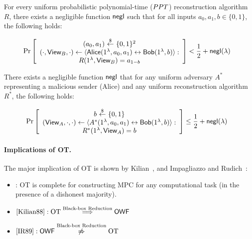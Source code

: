 
\begin{definition}


For every uniform probabilistic polynomial-time ($PPT$) reconstruction algorithm $R$, there exists a negligible function ${\sf negl}$ such that for all inputs $a_0,a_1,b\in\{0,1\}$, the following holds:

\[
\Pr \left[
\begin{array}{c}
(a_0,a_1)~{\overset{\$}{\leftarrow}}~ \{0,1\}^2\\
(\cdot,{\sf View}_B,\cdot) \leftarrow \langle {\sf Alice}(1^\lambda, a_0, a_1) \leftrightarrow {\sf Bob}(1^\lambda, b)\rangle : \\
R(1^\lambda, {\sf View}_B) = a_{1-b}
\end{array}
\right] < \frac{1}{2} + {\sf negl}(\lambda)
\]

\end{definition}

\begin{definition}
    

There exists a negligible function ${\sf negl}$ that for any uniform \PPT adversary $A^*$ representing a malicious sender (Alice) and any uniform \PPT reconstruction algorithm $R^*$, the following holds:

\[
\Pr \left[
\begin{array}{c}
b ~{\overset{\$}{\leftarrow}}~ \{0,1\} \\
({\sf View}_A, \cdot, \cdot)\leftarrow \langle A^*(1^\lambda, a_0, a_1) \leftrightarrow {\sf Bob}(1^\lambda, b)\rangle : \\
R^*(1^\lambda,{\sf View}_A) = b
\end{array}
\right] \leq \frac{1}{2} + {\sf negl}(\lambda)
\]
\end{definition}

\paragraph{Implications of OT.}

The major implication of OT is shown by Kilian~\cite{Kilian88}, and Impagliazzo and Rudich~\cite{IR89}:
\begin{itemize}
    \item \cite{Kilian88}: OT is complete for constructing MPC for any computational task (in the presence of a dishonest majority). 
    \item $
            \cite{Kilian88} : \text{OT} \overset{\text{Black-box Reduction}}{\implies} {\sf OWF}
            $

    \item $
        \cite{IR89} : {\sf OWF} \overset{\text{Black-box Reduction}}{\not\Rightarrow}\text{OT}
    $
            
\end{itemize}

